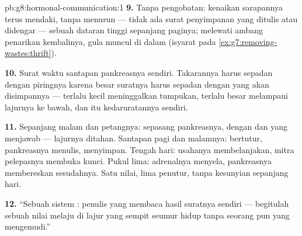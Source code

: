 \begin{solution}{pb:g8:hormonal-communication:1}
\textbf{9.} Tanpa pengobatan: kenaikan sarapannya terus
mendaki, tanpa menurun --- tidak ada surat penyimpanan yang
ditulis atau didengar --- sebuah dataran tinggi sepanjang
paginya; melewati ambang penarikan kembalinya, gula muncul
di dalam  (isyarat pada
\cref{ex:g7:removing-wastes:thrift}).

\textbf{10.} Surat waktu santapan pankreasnya sendiri.
Takarannya harus sepadan dengan piringnya karena besar
suratnya harus sepadan dengan  yang akan
disimpannya --- terlalu kecil meninggalkan tumpukan,
terlalu besar melampaui lajurnya ke bawah, dan itu
kedaruratannya sendiri.

\textbf{11.} Sepanjang malam dan petangnya: sepasang 
pankreasnya, dengan  dan  yang menjawab ---
lajurnya ditahan. Santapan pagi dan malamnya: 
bertutur, pankreasnya menulis,  menyimpan. Tengah
hari: usahanya membelanjakan, mitra pelepasnya membuka
kunci. Pukul lima: adrenalnya menyela, pankreasnya
membereskan sesudahnya. Satu nilai, lima penutur, tanpa
kesunyian sepanjang hari.

\textbf{12.} ``Sebuah sistem : penulis yang
membaca hasil suratnya sendiri --- begitulah sebuah nilai
melaju di lajur yang sempit seumur hidup tanpa seorang pun
yang mengemudi.''
\end{solution}
